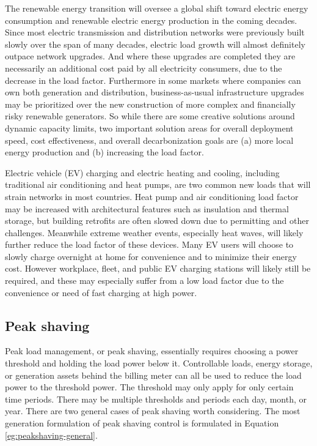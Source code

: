 \documentclass[
]{article}
\begin{document}
The renewable energy transition will oversee a global shift toward
electric energy consumption and renewable electric energy production in
the coming decades. Since most electric transmission and distribution
networks were previously built slowly over the span of many decades,
electric load growth will almost definitely outpace network upgrades.
And where these upgrades are completed they are necessarily an
additional cost paid by all electricity consumers, due to the decrease
in the load factor. Furthermore in some markets where companies can own
both generation and distribution, business-as-usual infrastructure
upgrades may be prioritized over the new construction of more complex
and financially risky renewable generators. So while there are some
creative solutions around dynamic capacity limits, two important
solution areas for overall deployment speed, cost effectiveness, and
overall decarbonization goals are (a) more local energy production and
(b) increasing the load factor.

Electric vehicle (EV) charging and electric heating and cooling,
including traditional air conditioning and heat pumps, are two common
new loads that will strain networks in most countries. Heat pump and air
conditioning load factor may be increased with architectural features
such as insulation and thermal storage, but building retrofits are often
slowed down due to permitting and other challenges. Meanwhile extreme
weather events, especially heat waves, will likely further reduce the
load factor of these devices. Many EV users will choose to slowly charge
overnight at home for convenience and to minimize their energy cost.
However workplace, fleet, and public EV charging stations will likely
still be required, and these may especially suffer from a low load
factor due to the convenience or need of fast charging at high power.

\hypertarget{peak-shaving}{%
  \subsection{Peak shaving}\label{peak-shaving}}

Peak load management, or peak shaving, essentially requires choosing a
power threshold and holding the load power below it. Controllable loads,
energy storage, or generation assets behind the billing meter can all be
used to reduce the load power to the threshold power. The threshold may
only apply for only certain time periods. There may be multiple
thresholds and periods each day, month, or year. There are two general
cases of peak shaving worth considering. The most generation formulation
of peak shaving control is formulated in Equation \ref{eg:peakshaving-general}.
\end{document}
